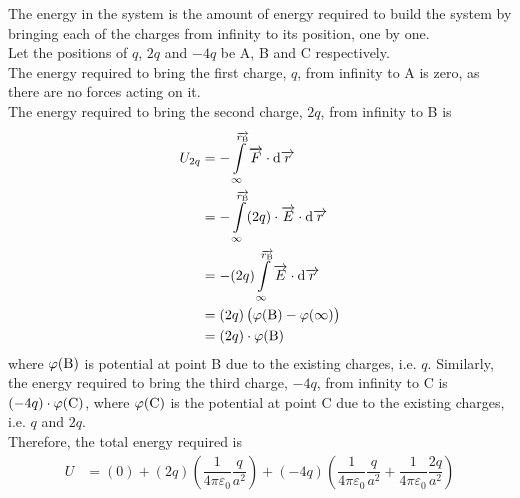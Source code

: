 \documentclass[fleqn, a4paper, 12pt, twoside]{article}
\theoremstyle{definition}
\theoremstyle{theorem}
\begin{document}
\begin{solution}
	\begin{figure}[H]
	\end{figure}
	The energy in the system is the amount of energy required to build the system by bringing each of the charges from infinity to its position, one by one.\\
	Let the positions of $q$, $2q$ and $-4q$ be A, B and C respectively.\\
	The energy required to bring the first charge, $q$, from infinity to A is zero, as there are no forces acting on it.\\
	The energy required to bring the second charge, $2q$, from infinity to B is 
	\begin{align*}
		U_{2q} &= - \int\limits_{\infty}^{\overrightarrow{r_\textnormal{B}}} \overrightarrow{F} \cdot \dif \overrightarrow{r}\\
		&= - \int\limits_{\infty}^{\overrightarrow{r_\textnormal{B}}} (2q) \cdot \overrightarrow{E} \cdot \dif \overrightarrow{r}\\
		&= - (2q) \int\limits_{\infty}^{\overrightarrow{r_\textnormal{B}}} \overrightarrow{E} \cdot \dif \overrightarrow{r}\\
		&= (2q) \left( \varphi(\textnormal{B}) - \varphi(\infty) \right)\\
		&= (2q) \cdot \varphi(\textnormal{B})
	\end{align*}
	where $\varphi(\textnormal{B})$ is potential at point B due to the existing charges, i.e. $q$.
	Similarly, the energy required to bring the third charge, $-4q$, from infinity to C is $(-4q) \cdot \varphi(\textnormal{C})$, where $\varphi(\textnormal{C})$ is the potential at point C due to the existing charges, i.e. $q$ and $2q$.\\
	Therefore, the total energy required is
	\begin{align*}
		U &= \left( 0 \right) + (2q) \left( \dfrac{1}{4 \pi \varepsilon_0} \dfrac{q}{a^2} \right) + (-4q) \left( \dfrac{1}{4 \pi \varepsilon_0} \dfrac{q}{a^2} + \dfrac{1}{4 \pi \varepsilon_0} \dfrac{2q}{a^2} \right)
	\end{align*}
\end{solution}
\end{document}
